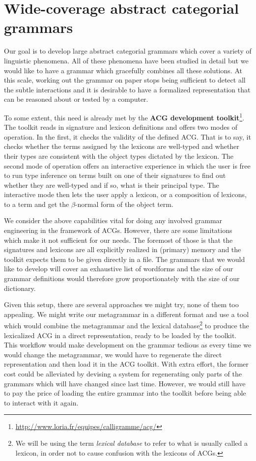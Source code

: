 \chapter{Wide-coverage abstract categorial grammars}

Our goal is to develop large abstract categorial grammars which cover a
variety of linguistic phenomena. All of these phenomena have been
studied in detail but we would like to have a grammar which gracefully
combines all these solutions. At this scale, working out the grammar on
paper stops being sufficient to detect all the subtle interactions and
it is desirable to have a formalized representation that can be reasoned
about or tested by a computer.

To some extent, this need is already met by the \textbf{ACG development
  toolkit}\footnote{\url{http://www.loria.fr/equipes/calligramme/acg/}}. The
toolkit reads in signature and lexicon definitions and offers two modes
of operation. In the first, it checks the validity of the defined
ACG. That is to say, it checks whether the terms assigned by the
lexicons are well-typed and whether their types are consistent with the
object types dictated by the lexicon. The second mode of operation
offers an interactive experience in which the user is free to run type
inference on terms built on one of their signatures to find out whether
they are well-typed and if so, what is their principal type. The
interactive mode then lets the user apply a lexicon, or a composition of
lexicons, to a term and get the $\beta$-normal form of the object term.

We consider the above capabilities vital for doing any involved grammar
engineering in the framework of ACGs. However, there are some
limitations which make it not sufficient for our needs. The foremost of
those is that the signatures and lexicons are all explicitly realized in
(primary) memory and the toolkit expects them to be given directly in a
file. The grammars that we would like to develop will cover an
exhaustive list of wordforms and the size of our grammar definitions
would therefore grow proportionately with the size of our dictionary.

Given this setup, there are several approaches we might try, none of
them too appealing. We might write our metagrammar in a different format
and use a tool which would combine the metagrammar and the lexical
database\footnote{We will be using the term \emph{lexical database} to
  refer to what is usually called a lexicon, in order not to cause
  confusion with the lexicons of ACGs.} to produce the lexicalized ACG
in a direct representation, ready to be loaded by the toolkit. This
workflow would make development on the grammar tedious as every time we
would change the metagrammar, we would have to regenerate the direct
representation and then load it in the ACG toolkit. With extra effort,
the former cost could be alleviated by devising a system for
regenerating only parts of the grammars which will have changed since
last time. However, we would still have to pay the price of loading the
entire grammar into the toolkit before being able to interact with it
again.

